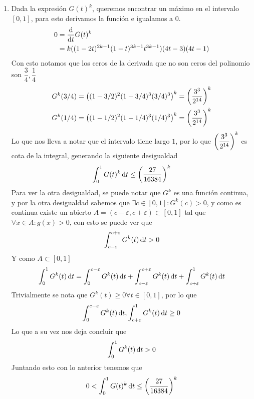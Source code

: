 \begin{sol}
\begin{enumerate}[label = \roman*]
		\item Dada la expresión $G(t)^k$, queremos encontrar un máximo en el intervalo $[0,1]$, para esto derivamos la función e igualamos a 0.
		      \begin{align*}
			      0 & =\frac{\operatorname{d}\!{}}{\operatorname{d}\!{t}}G(t)^k                          \\
			        & =k ((1-2t)^{2k-1}(1-t)^{3k-1}t^{3k-1})(4t-3)(4t-1)
		      \end{align*}
		      Con esto notamos que los ceros de la derivada que no son ceros del polinomio son $\dfrac34,\dfrac14$
		      \begin{align*}
				  &G^k(3/4)=\left((1-3/2)^2(1-3/4)^3(3/4)^3\right)^k=\left(\frac{3^3}{2^{14}}\right)^k\\
				  &G^k(1/4)=\left((1-1/2)^2(1-1/4)^3(1/4)^3\right)^k=\left(\frac{3^3}{2^{14}}\right)^k
			  \end{align*}
			  Lo que nos lleva a notar que el intervalo tiene largo $1$, por lo que $\left(\dfrac{3^3}{2^{14}}\right)^k$ es cota de la integral, generando la siguiente desigualdad
			  \[\int^1_0G(t)^k\operatorname{d}\!{t}\leq\left(\frac{27}{16384}\right)^k\]
		      Para ver la otra desigualdad, se puede notar que $G^k$ es una función continua, y por la otra desigualdad sabemos que $\exists c\in[0,1]:G^k(c)>0$, y como es continua existe un abierto $A=(c-\varepsilon,c+\varepsilon)\subset[0,1]$ tal que $\forall x\in A:g(x)>0$, con esto se puede ver que
		      \[\int_{c-\varepsilon}^{c+\varepsilon}G^k(t)\operatorname{d}\!{t}>0\]
		      Y como $A\subset[0,1]$
		      \[\int_0^1G^k(t)\operatorname{d}\!{t}=\int_0^{c-\varepsilon}G^k(t)\operatorname{d}\!{t}+\int_{c-\varepsilon}^{c+\varepsilon}G^k(t)\operatorname{d}\!{t}+\int_{c+\varepsilon}^1G^k(t)\operatorname{d}\!{t}\]
		      Trivialmente se nota que $G^k(t)\geq0\forall t\in[0,1]$, por lo que
		      \[\int_0^{c-\varepsilon}G^k(t)\operatorname{d}\!{t},\int_{c+\varepsilon}^1G^k(t)\operatorname{d}\!{t}\geq0\]
		      Lo que a su vez nos deja concluir que
		      \[\int_0^1G^k(t)\operatorname{d}\!{t}>0\]
		      Juntando esto con lo anterior tenemos que
		      \begin{equation*}
			      0<\int^1_0G(t)^k\operatorname{d}\!{t}\leq\left(\frac{27}{16384}\right)^k\label{eq:iii}
		      \end{equation*}


\end{enumerate}
\end{sol}

